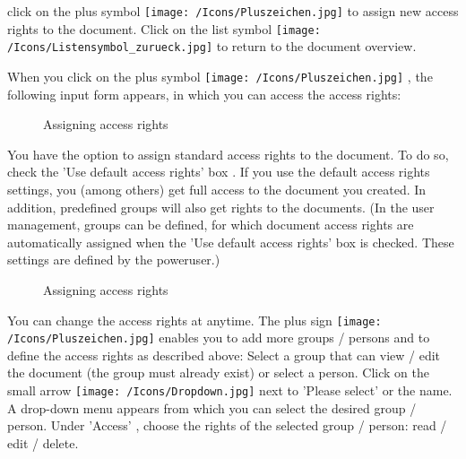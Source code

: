 click on the plus symbol \texttt{[image: /Icons/Pluszeichen.jpg]}  to assign new access rights to the document. Click on the list symbol \texttt{[image: /Icons/Listensymbol\_zurueck.jpg]}  to return to the document overview.

\vspace{\baselineskip}

When you click on the plus symbol \texttt{[image: /Icons/Pluszeichen.jpg]} , the following input form appears, in which you can access the access rights:

\begin{figure}[H]
\caption{Assigning access rights}
\end{figure}

You have the option to assign standard access rights to the document. To do so, check the 'Use default access rights' box . If you use the default access rights settings, you (among others) get full access to the document you created. In addition, predefined groups will also get rights to the documents. (In the user management, groups can be defined, for which document access rights are automatically assigned when the 'Use default access rights' box is checked. These settings are defined by the poweruser.)

\begin{figure}[H]
\caption{Assigning access rights}
\end{figure}

You can change the access rights at anytime. The plus sign \texttt{[image: /Icons/Pluszeichen.jpg]}  enables you to add more groups / persons and to define the access rights as described above: Select a group that can view / edit the document (the group must already exist) or select a person. Click on the small arrow \texttt{[image: /Icons/Dropdown.jpg]} next to 'Please select' or the name. A drop-down menu appears from which you can select the desired group / person. Under 'Access' , choose the rights of the selected group / person: read / edit / delete.

